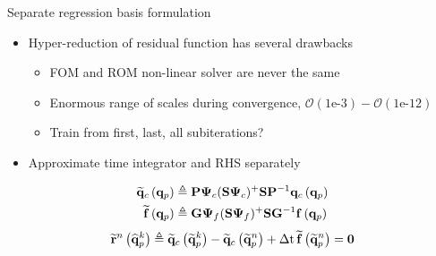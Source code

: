 \documentclass[]{beamer}
\begin{document}
\begin{frame}{Separate regression basis formulation}
    \begin{itemize}
		\item Hyper-reduction of residual function has several drawbacks
		\begin{itemize}
			\item FOM and ROM non-linear solver are never the same
			\item Enormous range of scales during convergence, $\mathcal{O}(1\text{e-}3)-\mathcal{O}(1\text{e-}12)$
			\item Train from first, last, all subiterations?
		\end{itemize}
		\item Approximate time integrator and RHS separately
	\end{itemize}
	\begin{align*}
		\consFuncRom{\primVec} &\triangleq \consScale \deimRegressorCons \consScaleInv \consFunc{\primVec} \\
		\rhsApproxFunc{\primVec} &\triangleq \rhsScale \deimRegressorRhs \rhsScaleInv \rhsFunc{\primVec}
	\end{align*}
	\begin{equation*}
		\mathbf{\widetilde{r}}^{n} \left(\mathbf{\widehat{q}}_p^{k}\right) \triangleq \mathbf{\widetilde{q}}_c \left(\mathbf{\widetilde{q}}_p^{k}\right) - \mathbf{\widetilde{q}}_c \left(\mathbf{\widetilde{q}}_p^{n}\right) + \Delta \text{t} \, \mathbf{\widetilde{\mathbf{f}}}\left(\mathbf{\widetilde{q}}_p^{n}\right) = \mathbf{0}
	\end{equation*}
\end{frame}
\end{document}
